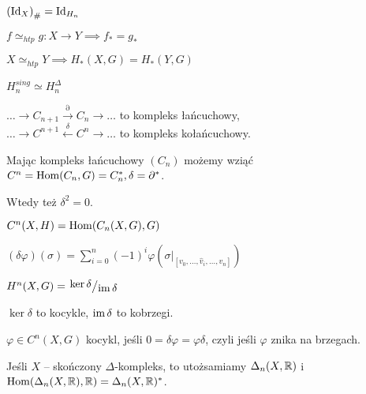 \begin{fakt}
	$\left({\mathrm{Id}}_X\right)_\# = {\mathrm{Id}}_{H_n}$
\end{fakt}

\begin{twierdzenie}
	$f \simeq_{htp} g : X \to Y \implies f_\ast = g_\ast$
\end{twierdzenie}

\begin{wniosek}
	$X \simeq_{htp} Y \implies H_\ast(X, G) = H_\ast(Y,G)$
\end{wniosek}

\begin{twierdzenie}
	$H_n^{sing} \simeq H_n^\Delta$
\end{twierdzenie}

\begin{definicja}[kompleksy]
	$\ldots \to C_{n+1} \xrightarrow{\partial} C_n \to \ldots$ to kompleks łańcuchowy, \\
	$\ldots \to C^{n+1} \xleftarrow{\delta} C^n \to \ldots$ to kompleks kołańcuchowy.
	
	Mając kompleks łańcuchowy $(C_n)$ możemy wziąć 
	$C^n = {\mathrm{Hom}}(C_n, G) = C_n^\ast, \delta = \partial^\ast$.
	
	Wtedy też $\delta^2 = 0$.
\end{definicja}

\begin{definicja}
	$C^n(X,H) = {\mathrm{Hom}}(C_n(X,G), G)$
	
	$\displaystyle (\delta \varphi)(\sigma) 
	= \sum_{i=0}^n (-1)^i \varphi
	\left(\sigma|_{[v_0, \ldots, \hat{v}_i, \ldots, v_n]} \right)$
\end{definicja}

\begin{definicja}
	$H^n(X,G) = \bigslant{\ker \delta}{\im \delta}$
	
	$\ker \delta$ to kocykle, ${\mathrm{im}\,} \delta$ to kobrzegi.
\end{definicja}

\begin{uwaga}
	$\varphi \in C^n(X,G)$ kocykl, jeśli 
	$0 = \delta \varphi = \varphi \delta$, 
	czyli jeśli $\varphi$ znika na brzegach.
\end{uwaga}

\begin{uwaga}
	Jeśli $X$ -- skończony $\Delta$-kompleks, 
	to utożsamiamy $\Delta_n(X, {\mathbb{R}})$ 
	i~${\mathrm{Hom}}(\Delta_n(X,{\mathbb{R}}), {\mathbb{R}}) = \Delta_n(X, {\mathbb{R}})^\ast$.
\end{uwaga}

